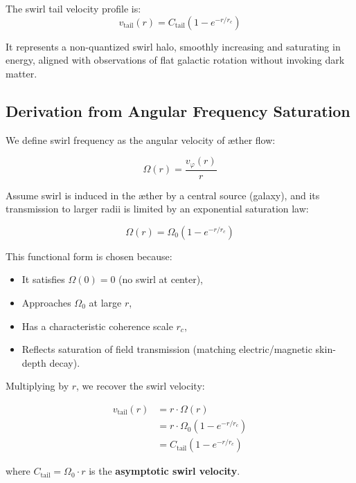 \documentclass[12pt]{article}
\begin{document}
The swirl tail velocity profile is:
\[
\boxed{
v_\text{tail}(r) = C_{\text{tail}} \left(1 - e^{-r/r_c} \right)
}
\]

It represents a non-quantized swirl halo, smoothly increasing and saturating in energy, aligned with observations of flat galactic rotation without invoking dark matter.

\subsection{Derivation from Angular Frequency Saturation}

We define swirl frequency as the angular velocity of æther flow:

\begin{equation}
    \Omega(r) = \frac{v_\varphi(r)}{r}
    \label{eq:omega_definition}
\end{equation}

Assume swirl is induced in the æther by a central source (galaxy), and its transmission to larger radii is limited by an exponential saturation law:

\begin{equation}
    \Omega(r) = \Omega_0 \left( 1 - e^{-r/r_c} \right)
    \label{eq:omega_saturation}
\end{equation}

This functional form is chosen because:
\begin{itemize}
    \item It satisfies \( \Omega(0) = 0 \) (no swirl at center),
    \item Approaches \( \Omega_0 \) at large \( r \),
    \item Has a characteristic coherence scale \( r_c \),
    \item Reflects saturation of field transmission (matching electric/magnetic skin-depth decay).
\end{itemize}

Multiplying by \( r \), we recover the swirl velocity:

\begin{align}
    v_\text{tail}(r)
    &= r \cdot \Omega(r) \\
    &= r \cdot \Omega_0 \left( 1 - e^{-r/r_c} \right) \\
    &= C_{\text{tail}} \left( 1 - e^{-r/r_c} \right)
    \label{eq:tail_velocity}
\end{align}

where \( C_{\text{tail}} = \Omega_0 \cdot r \) is the \textbf{asymptotic swirl velocity}.
\end{document}

